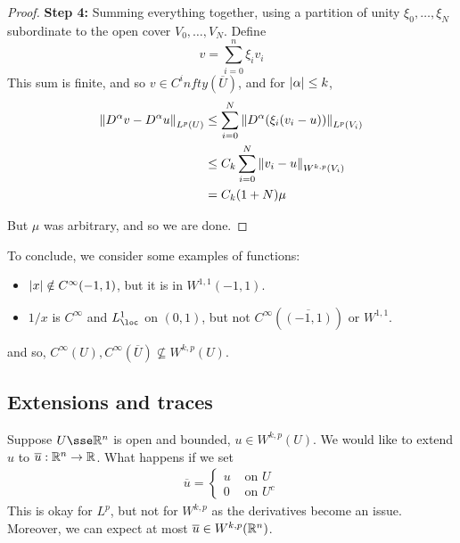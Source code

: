 \documentclass{article}
\begin{document}
\begin{proof}
    \textbf{Step 4:} Summing everything together, using a partition of unity \(\xi_0, \dots, \xi_N\) subordinate to the open cover \(V_0, \dots, V_N\). Define
    \[v = \sum_{i=0}^n\xi_i v_i\]
    This sum is finite, and so \(v \in C^infty(\overline{U})\), and for \(\abs{\alpha} \le k\),
    \begin{align*}
        \norm{D^\alpha v - D^\alpha u}_{L^p(U)} &\le \sum_{i=0}^N\norm{D^\alpha(\xi_i(v_i - u))}_{L^p(V_i)} \\
        &\le C_k\sum_{i=0}^N\norm{v_i - u}_{W^{k, p}(V_i)} \\
        &= C_k(1+ N)\mu
    \end{align*}

    But \(\mu\) was arbitrary, and so we are done.
\end{proof}

\lec

To conclude, we consider some examples of functions:

\begin{itemize}
    \item \(\abs{x} \notin C^\infty(-1, 1)\), but it is in \(W^{1,1}(-1, 1)\).
    \item \(1/x\) is \(C^\infty\) and \(L^1_\loc\) on \((0, 1)\), but not \(C^\infty(\overline{(-1,1)})\) or \(W^{1, 1}\).
\end{itemize}
and so, \(C^\infty(U), C^\infty(\overline U) \not\subseteq W^{k,p}(U)\).

\subsection{Extensions and traces}

Suppose \(U \sse \R^n\) is open and bounded, \(u \in W^{k,p}(U)\). We would like to extend \(u\) to \(\overline{u} : \mathbb{R}^n \to \mathbb{R}\). What happens if we set
\begin{align*}
    \overline u = \begin{cases}
        u & \text{ on }U \\
        0 & \text{ on }U^c
    \end{cases}
\end{align*}
This is okay for \(L^p\), but not for \(W^{k, p}\) as the derivatives become an issue. Moreover, we can expect at most \(\overline u \in W^{k, p}(\mathbb{R}^n)\).
\end{document}
